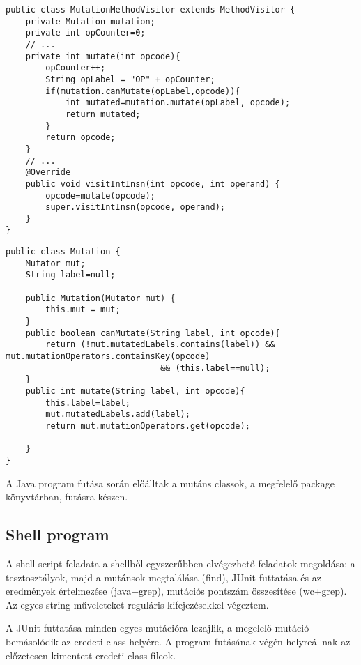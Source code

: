 \begin{lstlisting}[frame=single,float=!ht,caption={MutationMethodVisitor},captionpos=b,label={lst:tool_mutationmethodvisitor}]
public class MutationMethodVisitor extends MethodVisitor {
    private Mutation mutation;
    private int opCounter=0;
    // ...
    private int mutate(int opcode){
        opCounter++;
        String opLabel = "OP" + opCounter;
        if(mutation.canMutate(opLabel,opcode)){
            int mutated=mutation.mutate(opLabel, opcode);
            return mutated;
        }
        return opcode;
    }
    // ...
    @Override
    public void visitIntInsn(int opcode, int operand) {
        opcode=mutate(opcode);
        super.visitIntInsn(opcode, operand);
    }
}
\end{lstlisting}

\begin{lstlisting}[frame=single,float=!ht,caption={A Mutation osztály},captionpos=b,label={lst:tool_mutation_class}]
public class Mutation {
    Mutator mut;
    String label=null;

    public Mutation(Mutator mut) {
        this.mut = mut;
    }
    public boolean canMutate(String label, int opcode){
        return (!mut.mutatedLabels.contains(label)) && mut.mutationOperators.containsKey(opcode) 
                               && (this.label==null);
    }
    public int mutate(String label, int opcode){
        this.label=label;
        mut.mutatedLabels.add(label);
        return mut.mutationOperators.get(opcode);

    }
}
\end{lstlisting}
A Java program futása során előálltak a mutáns classok, a megfelelő package könyvtárban, futásra készen.
\subsection{Shell program}
A shell script feladata a shellből egyszerűbben elvégezhető feladatok megoldása: a tesztosztályok, majd a mutánsok megtalálása (find), JUnit futtatása és az eredmények értelmezése (java+grep), mutációs pontszám összesítése (wc+grep). Az egyes string műveleteket reguláris kifejezésekkel végeztem.

A JUnit futtatása minden egyes mutációra lezajlik, a megelelő mutáció bemásolódik az eredeti class helyére.  A program futásának végén helyreállnak az előzetesen kimentett eredeti class fileok.

